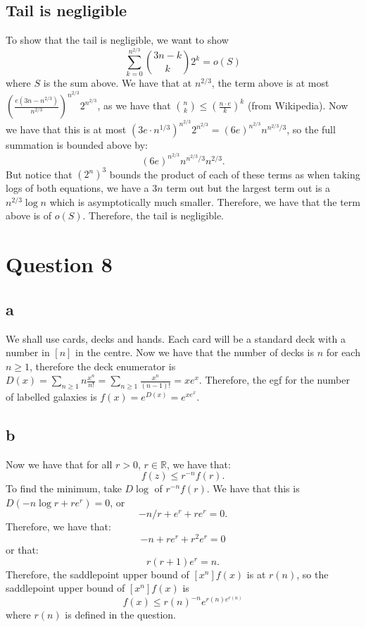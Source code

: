 \documentclass[]{article}
\theoremstyle{definition}
\numberwithin{theorem}{section}
\numberwithin{equation}{section}
\begin{document}
\subsection{Tail is negligible}
To show that the tail is negligible, we want to show
\begin{equation}
	\sum_{k = 0}^{n^{2/3}}\binom{3n - k}{k} 2^k = o(S)
\end{equation}
where $S$ is the sum above. 
We have that at $n^{2/3}$, the term above is at most $\left(\frac{e(3n - n^{2/3})}{n^{2/3}}\right)^{n^{2/3}} 2^{n^{2/3}}$, as we have that $\binom{n}{k} \leq \left(\frac{n \cdot e}{k}\right)^k$ (from Wikipedia). Now we have that this is at most $(3e \cdot n^{1/3})^{n^{2/3}} 2^{n^{2/3}} = (6e)^{n^{2/3}} n^{n^{2/3}/3}$, so the full summation is bounded above by:
\begin{equation}
	(6e)^{n^{2/3}} n^{n^{2/3}/3} n^{2/3}.
\end{equation} 
But notice that $(2^n)^3$ bounds the product of each of these terms as when taking logs of both equations, we have a $3n$ term out but the largest term out is a $ n^{2/3} \log n$ which is asymptotically much smaller. Therefore, we have that the term above is of $o(S)$. Therefore, the tail is negligible. 
\section{Question 8}
\subsection{a}
We shall use cards, decks and hands. Each card will be a standard deck with a number in $[n]$ in the centre. Now we have that the number of decks is $n$ for each $n \geq 1$, therefore the deck enumerator is $D(x) = \sum_{n \geq 1} n \frac{x^n}{n!} = \sum_{n \geq 1} \frac{x^n}{(n - 1)!} = x e^x$. 
Therefore, the egf for the number of labelled galaxies is $f(x) = e^{D(x)} = e^{x e^x}$. 

\subsection{b}
Now we have that for all $r > 0$, $r \in \mathbb{R}$, we have that:
\begin{equation}
	[z^n] f(z) \leq r^{-n} f(r).
\end{equation}
To find the minimum, take $D \log$ of $r^{-n} f(r)$. We have that this is $D(-n \log r + r e^r) = 0$, or 
\begin{equation}
	-n/r + e^r + r e^r = 0.
\end{equation}
Therefore, we have that:
\begin{equation}
	-n + r e^r + r^2 e^r = 0
\end{equation}
or that:
\begin{equation}
	r (r + 1) e^r = n.
\end{equation}
Therefore, the saddlepoint upper bound of $[x^n] f(x)$ is at $r(n)$, so the saddlepoint upper bound of $[x^n] f(x)$ is
\begin{equation}
	[x^n] f(x) \leq r(n)^{-n} e^{r(n) e^{r(n)}}
\end{equation}
 where $r(n)$ is defined in the question. 
\end{document}
